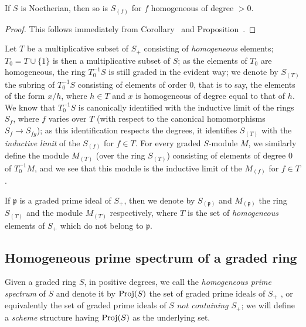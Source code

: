 \begin{corollary}[2.2.6]
\label{II.2.2.6}
If $S$ is Noetherian, then so is $S_{(f)}$ for $f$ homogeneous of degree $>0$.
\end{corollary}

\begin{proof}
This follows immediately from Corollary~ and Proposition~.
\end{proof}

\begin{env}[2.2.7]
\label{II.2.2.7}
Let $T$ be a multiplicative subset of $S_+$ consisting of \emph{homogeneous} elements;
$T_0=T\cup\{1\}$ is then a multiplicative subset of $S$;
as the elements of $T_0$ are homogeneous, the ring $T_0^{-1}S$ is still graded in the evident way;
we denote by $S_{(T)}$ the subring of $T_0^{-1}S$ consisting of elements of order $0$, that is to say, the elements of the form $x/h$, where $h\in T$ and $x$ is homogeneous of degree equal to that of $h$.
We know  that $T_0^{-1}S$ is canonically identified with the inductive limit of the rings $S_f$, where $f$ varies over $T$ (with respect to the canonical homomorphisms $S_f\to S_{fg}$);
as this identification respects the degrees, it identifies $S_{(T)}$ with the \emph{inductive limit} of the $S_{(f)}$ for $f\in T$.
For every graded $S$-module $M$, we similarly define the module $M_{(T)}$ (over the ring $S_{(T)}$) consisting of elements of degree $0$ of $T_0^{-1}M$, and we see that this module is the inductive limit of the $M_{(f)}$ for $f\in T$.

If $\mathfrak{p}$ is a graded prime ideal of $S_+$, then we denote by $S_{(\mathfrak{p})}$ and $M_{(\mathfrak{p})}$ the ring $S_{(T)}$ and the module $M_{(T)}$ respectively, where $T$ is the set of \emph{homogeneous} elements of $S_+$ which do not belong to $\mathfrak{p}$.\end{env}

\subsection{Homogeneous prime spectrum of a graded ring}
\label{subsection:II.2.3}

\begin{env}[2.3.1]
\label{II.2.3.1}
Given a graded ring $S$, in positive degrees, we call the \emph{homogeneous prime spectrum} of $S$ and denote it by $\operatorname{Proj}(S)$ the set of graded prime ideals of $S_+$ , or equivalently the set of graded prime ideals of $S$ \emph{not containing $S_+$};
we will define a \emph{scheme} structure having $\operatorname{Proj}(S)$ as the underlying set.
\end{env}

